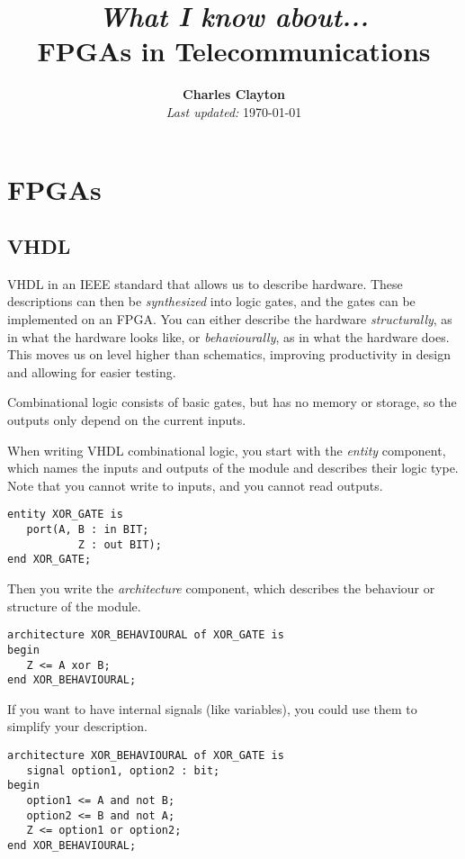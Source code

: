 \documentclass{IEEEtran}
\title{\small \textit{What I know about...} \\ \Huge FPGAs in Telecommunications}
\author{\textbf{Charles Clayton} \\ \small \textit{Last updated:} \today}
\begin{document}
\maketitle

\section{FPGAs}


\subsection{VHDL}

VHDL in an IEEE standard that allows us to describe hardware. These descriptions can then be \textit{synthesized} into logic gates, and the gates can be implemented on an FPGA. You can either describe the hardware \textit{structurally}, as in what the hardware looks like, or \textit{behaviourally}, as in what the hardware does. This moves us on level higher than schematics, improving productivity in design and allowing for easier testing.

Combinational logic consists of basic gates, but has no memory or storage, so the outputs only depend on the current inputs. 

When writing VHDL combinational logic, you start with the \textit{entity} component, which names the inputs and outputs of the module and describes their logic type. Note that you cannot write to inputs, and you cannot read outputs.

\begin{Verbatim}[fontsize=\scriptsize, xleftmargin=.3in, commandchars=\\\{\}]
entity XOR_GATE is 
   port(A, B : in BIT;
           Z : out BIT);
end XOR_GATE;
\end{Verbatim}

Then you write the \textit{architecture} component, which describes the behaviour or structure of the module.

\begin{Verbatim}[fontsize=\scriptsize, xleftmargin=.3in, commandchars=\\\{\}]
architecture XOR_BEHAVIOURAL of XOR_GATE is 
begin 
   Z <= A xor B;
end XOR_BEHAVIOURAL;
\end{Verbatim}

If you want to have internal signals (like variables), you could use them to simplify your description.

\begin{Verbatim}[fontsize=\scriptsize, xleftmargin=.3in, commandchars=\\\{\}]
architecture XOR_BEHAVIOURAL of XOR_GATE is 
   signal option1, option2 : bit;
begin 
   option1 <= A and not B;
   option2 <= B and not A;
   Z <= option1 or option2;
end XOR_BEHAVIOURAL;
\end{Verbatim}
\end{document}
